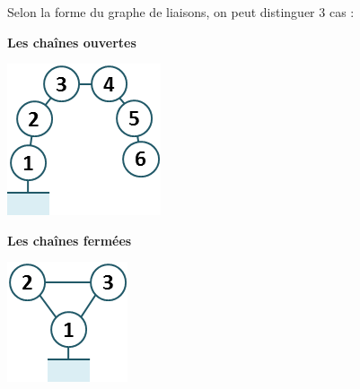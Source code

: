 \begin{defi}
Selon la forme du graphe de liaisons, on peut distinguer 3 cas :
\begin{multicols}{3}
\begin{center}
\textbf{Les chaînes ouvertes} 
\end{center}

\begin{center}


\includegraphics[width=.5\linewidth]{images/ericc_02}
\end{center}


\vfill\null
\columnbreak

\begin{center}
\textbf{Les chaînes fermées} 
\end{center}

\begin{center}


\includegraphics[width=.5\linewidth]{images/sympact_02}
\end{center}


\end{multicols}
\end{defi}
